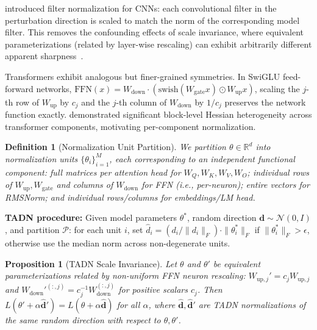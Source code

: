 \documentclass{article}
\newtheorem{proposition}{Proposition}
\newtheorem{definition}{Definition}
\begin{document}
\citet{li2018visualizing} introduced filter normalization for CNNs: each convolutional filter in the perturbation direction is scaled to match the norm of the corresponding model filter. This removes the confounding effects of scale invariance, where equivalent parameterizations (related by layer-wise rescaling) can exhibit arbitrarily different apparent sharpness~\citep{dinh2017sharp}.

Transformers exhibit analogous but finer-grained symmetries. In SwiGLU feed-forward networks, $\text{FFN}(x) = W_{\text{down}} \cdot (\text{swish}(W_{\text{gate}} x) \odot W_{\text{up}} x)$, scaling the $j$-th row of $W_{\text{up}}$ by $c_j$ and the $j$-th column of $W_{\text{down}}$ by $1/c_j$ preserves the network function exactly. \citet{zhang2024why} demonstrated significant block-level Hessian heterogeneity across transformer components, motivating per-component normalization.

\begin{definition}[Normalization Unit Partition]
\label{def:partition}
We partition $\theta \in \mathbb{R}^d$ into normalization units $\{\theta_i\}_{i=1}^{M}$, each corresponding to an independent functional component: full matrices per attention head for $W_Q, W_K, W_V, W_O$; individual rows of $W_{\text{up}}, W_{\text{gate}}$ and columns of $W_{\text{down}}$ for FFN (i.e., per-neuron); entire vectors for RMSNorm; and individual rows/columns for embeddings/LM head.
\end{definition}

\textbf{TADN procedure:} Given model parameters $\theta^*$, random direction $\mathbf{d} \sim \mathcal{N}(0, I)$, and partition $\mathcal{P}$: for each unit $i$, set $\hat{d}_i = (d_i / \|d_i\|_F) \cdot \|\theta_i^*\|_F$ if $\|\theta_i^*\|_F > \epsilon$, otherwise use the median norm across non-degenerate units.

\begin{proposition}[TADN Scale Invariance]
\label{prop:tadn_invariance}
Let $\theta$ and $\theta'$ be equivalent parameterizations related by non-uniform FFN neuron rescaling: $W_{\mathrm{up},j}' = c_j W_{\mathrm{up},j}$ and $W_{\mathrm{down}}'^{(:,j)} = c_j^{-1} W_{\mathrm{down}}^{(:,j)}$ for positive scalars $c_j$. Then $L(\theta' + \alpha \hat{\mathbf{d}}') = L(\theta + \alpha \hat{\mathbf{d}})$ for all $\alpha$, where $\hat{\mathbf{d}}, \hat{\mathbf{d}}'$ are TADN normalizations of the same random direction with respect to $\theta, \theta'$.
\end{proposition}
\end{document}
